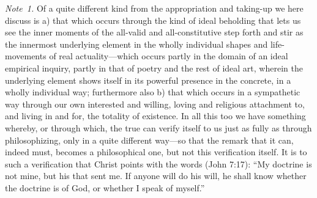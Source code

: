 \documentclass[12pt,a4paper]{book}
\begin{document}
{\small\emph{Note~1.} Of a quite different kind from the appropriation and taking-up
we here discuss is a) that which occurs through the kind of ideal beholding that
lets us see the inner moments of the all-valid and all-constitutive step forth and
stir as the innermost underlying element in the wholly individual shapes and
life-movements of real actuality---which occurs partly in the domain of an ideal
empirical inquiry, partly in that of poetry and the rest of ideal art, wherein the
underlying element shows itself in its powerful presence in the concrete, in a
wholly individual way; furthermore also b) that which occurs in a sympathetic way
through our own interested and willing, loving and religious attachment to, and
living in and for, the totality of existence. In all this too we have something
whereby, or through which, the true can verify itself to us just as fully as
through philosophizing, only in a quite different way---so that the remark that it
can, indeed must, becomes a philosophical one, but not this verification itself. It
is to such a verification that Christ points with the words (John 7:17): ``My
doctrine is not mine, but his that sent me. If anyone will do his will, he shall
know whether the doctrine is of God, or whether I speak of myself.''\par}
\end{document}
